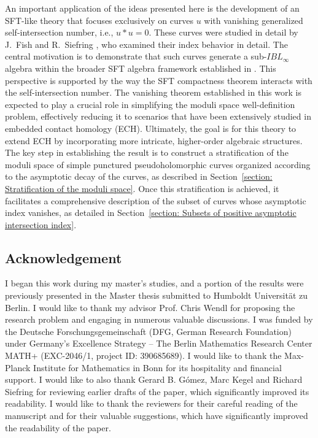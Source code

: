 \documentclass[11pt, a4paper]{amsart}
\begin{document}
An important application of the ideas presented here is the development of an SFT-like theory that focuses exclusively on curves $u$ with vanishing generalized self-intersection number, i.e., $u * u = 0$. These curves were studied in detail by J.~Fish and R.~Siefring \cite{Fish_Siefring_FEF1}, who examined their index behavior in detail. The central motivation is to demonstrate that such curves generate a sub-$IBL_\infty$ algebra within the broader SFT algebra framework established in \cite{CFL_homotopyIBL}. This perspective is supported by the way the SFT compactness theorem \cite{SFTCompactness} interacts with the self-intersection number. The vanishing theorem established in this work is expected to play a crucial role in simplifying the moduli space well-definition problem, effectively reducing it to scenarios that have been extensively studied in embedded contact homology (ECH). Ultimately, the goal is for this theory to extend ECH by incorporating more intricate, higher-order algebraic structures.\\

The key step in establishing the result is to construct a stratification of the moduli space of simple punctured pseudoholomorphic curves organized according to the asymptotic decay of the curves, as described in Section~\ref{section: Stratification of the moduli space}. Once this stratification is achieved, it facilitates a comprehensive description of the subset of curves whose asymptotic index vanishes, as detailed in Section~\ref{section: Subsets of positive asymptotic intersection index}.

\subsection*{Acknowledgement}
I began this work during my master's studies, and a portion of the results were previously presented in the Master thesis \cite{MasterThesis} submitted to Humboldt Universit\"at zu Berlin. I would like to thank my advisor Prof. Chris Wendl for proposing the research problem and engaging in numerous valuable discussions. I was funded by the Deutsche Forschungsgemeinschaft (DFG, German Research Foundation) under Germany's Excellence Strategy – The Berlin Mathematics Research Center MATH+ (EXC-2046/1, project ID: 390685689). I would like to thank the Max-Planck Institute for Mathematics in Bonn for its hospitality and financial support. I would like to also thank Gerard B. Gómez, Marc Kegel and Richard Siefring for reviewing earlier drafts of the paper, which significantly improved its readability. I would like to thank the reviewers for their careful reading of the manuscript and for their valuable suggestions, which have significantly improved the readability of the paper.
\end{document}
